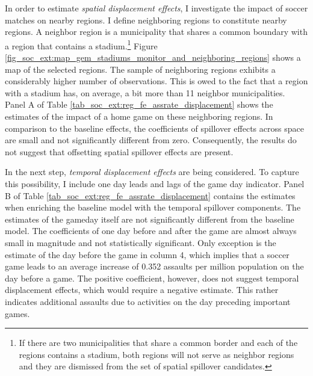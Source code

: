 \documentclass[11pt, a4paper]{article} %
\begin{document}
In order to estimate \textit{spatial displacement effects}, I investigate the impact of soccer matches on nearby regions. I define neighboring regions to constitute nearby regions. A neighbor region is a municipality that shares a common boundary with a region that contains a stadium.\footnote{If there are two municipalities that share a common border and each of the regions contains a stadium, both regions will not serve as neighbor regions and they are dismissed from the set of spatial spillover candidates.} Figure \ref{fig_soc_ext:map_gem_stadiums_monitor_and_neighboring_regions} shows a map of the selected regions. The sample of neighboring regions exhibits a considerably higher number of observations. This is owed to the fact that a region with a stadium has, on average, a bit more than 11 neighbor municipalities. Panel A of Table \ref{tab_soc_ext:reg_fe_assrate_displacement} shows the estimates of the impact of a home game on these neighboring regions. In comparison to the baseline effects, the coefficients of spillover effects across space are small and not significantly different from zero. Consequently, the results do not suggest that offsetting spatial spillover effects are present.

In the next step, \textit{temporal displacement effects} are being considered. To capture this possibility, I include one day leads and lags of the game day indicator. Panel B of Table \ref{tab_soc_ext:reg_fe_assrate_displacement} contains the estimates when enriching the baseline model with the temporal spillover components. The estimates of the gameday itself are not significantly different from the baseline model. The coefficients of one day before and after the game are almost always small in magnitude and not statistically significant. Only exception is the estimate of the day before the game in column 4, which implies that a soccer game leads to an average increase of 0.352 assaults per million population on the day before a game. The positive coefficient, however, does not suggest temporal displacement effects, which would require a negative estimate. This rather indicates additional assaults due to activities on the day preceding important games. 
\end{document}
